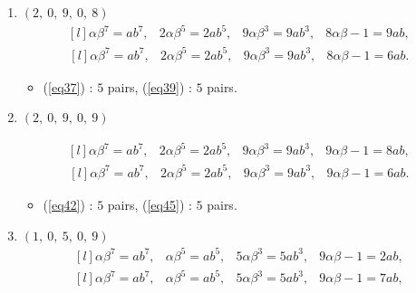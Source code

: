 \documentclass[12pt,a4wide, reqno]{amsart}
\theoremstyle{definition}
\theoremstyle{remark}
\numberwithin{equation}{section}
\begin{document}
\begin{enumerate}[label=\textbf{(\arabic*)}]
\begin{itemize}
    \end{itemize}
    \item 
    $(2,~0,~9,~0,~8)$ 
\begin{equation}\label{eq37}
    \begin{matrix*}[l]
          \alpha \beta ^7=ab^7, & 2\alpha \beta ^5=2ab^5, & 9\alpha \beta ^3=9ab^3, & 8\alpha\beta-1=9ab,
    \end{matrix*}
\end{equation}
\begin{equation}\label{eq39}
    \begin{matrix*}[l]
          \alpha \beta ^7=ab^7, & 2\alpha \beta ^5=2ab^5, & 9\alpha \beta ^3=9ab ^3, & 8\alpha\beta-1=6ab.
    \end{matrix*}
\end{equation}

\begin{itemize}
    \item 
    (\ref{eq37}) : $5$ pairs, (\ref{eq39}) : $5$ pairs.
    \end{itemize}

    \item 
    $(2,~0,~9,~0,~9)$ 

\begin{equation}\label{eq42}
    \begin{matrix*}[l]
          \alpha \beta ^7=ab^7, & 2\alpha \beta ^5=2ab^5, & 9\alpha \beta ^3=9ab ^3, & 9\alpha\beta-1=8ab,
    \end{matrix*}
\end{equation}
\begin{equation}\label{eq45}
    \begin{matrix*}[l]
          \alpha \beta ^7=ab^7, & 2\alpha \beta ^5=2ab^5, & 9\alpha \beta ^3=9ab ^3, & 9\alpha\beta-1=6ab.
    \end{matrix*}
\end{equation}

\begin{itemize}
    
    \item 
    (\ref{eq42}) : $5$ pairs, (\ref{eq45}) : $5$ pairs.
    \end{itemize}
    
    \item 
    $(1,~0,~5,~0,~9)$ 
\begin{equation}\label{eq46}
    \begin{matrix*}[l]
         \alpha \beta ^7=ab^7, & \alpha \beta ^5=ab^5, & 5\alpha \beta ^3=5ab ^3, & 9\alpha\beta-1=2ab,
    \end{matrix*}
\end{equation}
\begin{equation}\label{eq47}
    \begin{matrix*}[l]
          \alpha \beta ^7=ab^7, & \alpha \beta ^5=ab^5, & 5\alpha \beta ^3=5ab ^3, & 9\alpha\beta-1=7ab,
    \end{matrix*}
\end{equation}


\end{enumerate}
\end{document}
